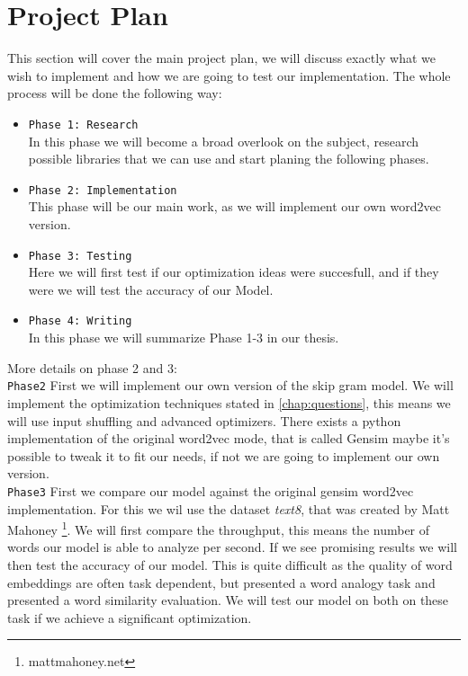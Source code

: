 \chapter{Project Plan}\label{chap:introduction}

This section will cover the main project plan, we will discuss exactly what we wish to implement and how we are going to test our implementation. 
The whole process will be done the following way: 
\begin{itemize}
\item \texttt{Phase 1: Research} \\ In this phase we will become a broad overlook on the subject, research possible libraries that we can use and start planing the following phases.
\item \texttt{Phase 2: Implementation} \\ This phase will be our main work, as we will implement our own word2vec version.
\item \texttt{Phase 3: Testing} \\ Here we will first test if our optimization ideas were succesfull, and if they were we will test the accuracy of our Model. 
\item \texttt{Phase 4: Writing} \\ In this phase we will summarize Phase 1-3 in our thesis. 
\end{itemize}
More details on phase 2 and 3:\\
\texttt{Phase2}
First we will implement our own version of the skip gram model. We will implement the optimization techniques stated in \ref{chap:questions}, this means we will use input shuffling and  advanced optimizers.  There exists a python implementation of the original word2vec mode, that is called Gensim \cite{gensim}maybe it's possible to tweak it to fit our needs, if not we are going to implement our own version. \\
\texttt{Phase3}
First we compare our model against the original gensim word2vec implementation. For this we wil use the dataset \textit{text8}, that was created by Matt Mahoney \footnote{mattmahoney.net}. We will first compare the throughput, this means the number of words our model is able to analyze per second. If we see promising results we will then test the accuracy of our model. This is quite difficult as the quality of word embeddings are often task dependent, but \cite{mikolov2} presented a word analogy task  and \cite{wSimilarity} presented a  word similarity evaluation. We will test our model on both on these task if we achieve a significant optimization. 

